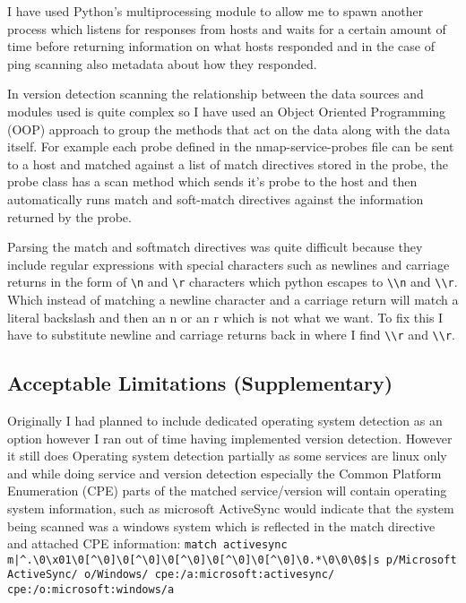 \documentclass[titlepage]{article}
\begin{document}
I have used Python's multiprocessing module to allow me to spawn another process which listens
for responses from hosts and waits for a certain amount of time before returning information
on what hosts responded and in the case of ping scanning also metadata about how they responded.

In version detection scanning the relationship between the data sources and modules used is quite
complex so I have used an Object Oriented Programming (OOP) approach to group the methods
that act on the data along with the data itself. For example each probe defined in the nmap-service-probes
file can be sent to a host and matched against a list of match directives stored in the probe,
the probe class has a scan method which sends it's probe to the host and then automatically runs
match and soft-match directives against the information returned by the probe.

Parsing the match and softmatch directives was quite difficult because they include regular
expressions with special characters such as newlines and carriage returns in the form of
\verb|\n| and \verb|\r| characters which python escapes to \verb|\\n|
and \verb|\\r|. Which instead of matching a newline character and a carriage return
will match a literal backslash and then an n or an r which is not what we want. To fix this I have to substitute
newline and carriage returns back in where I find \verb|\\r| and \verb|\\r|.

\subsection{Acceptable Limitations (Supplementary)}

Originally I had planned to include dedicated operating system detection as an option
however I ran out of time having implemented version detection. However it still does
Operating system detection partially as some services are linux only and while doing
service and version detection especially the Common Platform Enumeration (CPE) parts
of the matched service/version will contain operating system information, such as
microsoft ActiveSync would indicate that the system being scanned was a windows system
which is reflected in the match directive and attached CPE information: 
\texttt{match activesync m|{\textasciicircum}.{\textbackslash}0{\textbackslash}x01{\textbackslash}0[{\textasciicircum}{\textbackslash}0]{\textbackslash}0[{\textasciicircum}{\textbackslash}0]{\textbackslash}0[{\textasciicircum}{\textbackslash}0]{\textbackslash}0[{\textasciicircum}{\textbackslash}0]{\textbackslash}0[{\textasciicircum}{\textbackslash}0]{\textbackslash}0.*{\textbackslash}0{\textbackslash}0{\textbackslash}0\$|s p/Microsoft ActiveSync/ o/Windows/ cpe:/a:microsoft:activesync/ cpe:/o:microsoft:windows/a}
\end{document}
